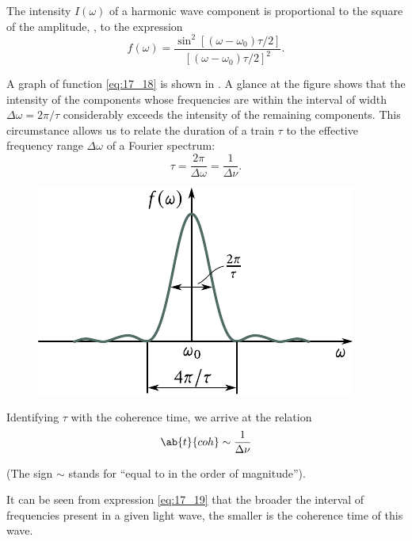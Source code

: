 The intensity $I(\omega)$ of a harmonic wave component is proportional to the square of the amplitude, \ie, to the expression
\begin{equation}\label{eq:17_18}
    f(\omega) = \frac{\sin^2[(\omega-\omega_0)\tau/2]}{[(\omega-\omega_0)\tau/2]^2}.
\end{equation}

\noindent
A graph of function \eqref{eq:17_18} is shown in .
A glance at the figure shows that the intensity of the components whose frequencies are within the interval of width $\Delta{\omega} = 2\pi/\tau$ considerably exceeds the intensity of the remaining components.
This circumstance allows us to relate the duration of a train $\tau$ to the effective frequency range $\Delta{\omega}$ of a Fourier spectrum:
\begin{equation*}
    \tau = \frac{2\pi}{\Delta{\omega}} = \frac{1}{\Delta{\nu}}.
\end{equation*}

\begin{figure}[!htb]
	\begin{center}
		\includegraphics[scale=1]{figures/ch_17/fig_17_5.pdf}
		\caption[]{}
		\label{fig:17_5}
	\end{center}
	\vspace{-0.9cm}
\end{figure}

Identifying $\tau$ with the coherence time, we arrive at the relation
\begin{equation}\label{eq:17_19}
    \ab{t}{coh} \sim \frac{1}{\Delta{\nu}}
\end{equation}

\noindent
(The sign $\sim$ stands for ``equal to in the order of magnitude'').

It can be seen from expression \eqref{eq:17_19} that the broader the interval of frequencies present in a given light wave, the smaller is the coherence time of this wave.

